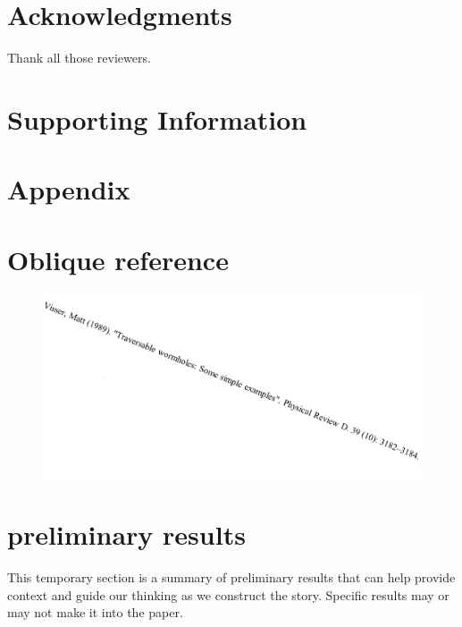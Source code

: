\documentclass{article}
\begin{document}
\section{Acknowledgments}
Thank all those reviewers.

\section{Supporting Information}

\section{Appendix}



\section{Oblique reference}

\begin{figure}[H]
	\includegraphics[scale=0.5]{../figures/oblique_reference.png}
\end{figure}

\section{preliminary results}
This temporary section is a summary of preliminary results that can help provide context and guide our thinking as we construct the story.  Specific results may or may not make it into the paper.
\end{document}
